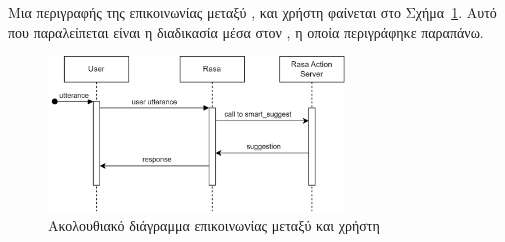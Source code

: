 Μια περιγραφής της επικοινωνίας μεταξύ ,  και χρήστη φαίνεται στο Σχήμα~\ref{fig:rasa_sequence}. Αυτό που παραλείπεται είναι η διαδικασία μέσα στον , η οποία περιγράφηκε παραπάνω.

\begin{figure}
    \centering
    \includegraphics[width=0.7\textwidth]{body_matter/our_work/images/Rasa_ActionServer.png}
    \caption{Ακολουθιακό διάγραμμα επικοινωνίας μεταξύ  και χρήστη}
    \label{fig:rasa_sequence}
\end{figure}

